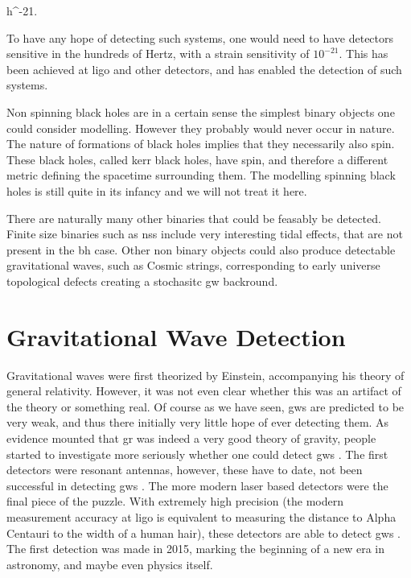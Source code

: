\documentclass[
  10pt,
  a4paper,
  DIV=11,
  numbers=noendperiod,
  twoside]{scrreprt}
\let\[\relax \let\]\relax %
\DeclareRobustCommand{\[}{\begin{equation}}
\DeclareRobustCommand{\]}{\end{equation}}
\begin{document}
\[
h^{-21}.
\]

To have any hope of detecting such systems, one would need to have
detectors sensitive in the hundreds of Hertz, with a strain sensitivity
of \(10^{-21}\). This has been achieved at \gls{ligo} and other
detectors, and has enabled the detection of such systems.

Non spinning black holes are in a certain sense the simplest binary
objects one could consider modelling. However they probably would never
occur in nature. The nature of formations of black holes implies that
they necessarily also spin. These black holes, called kerr black holes,
have spin, and therefore a different metric defining the spacetime
surrounding them. The modelling spinning black holes is still quite in
its infancy and we will not treat it here.

There are naturally many other binaries that could be feasably be
detected. Finite size binaries such as \glspl{ns} include very
interesting tidal effects, that are not present in the \gls{bh} case.
Other non binary objects could also produce detectable gravitational
waves, such as Cosmic strings, corresponding to early universe
topological defects creating a stochasitc \gls{gw} backround.


\hypertarget{gravitational-wave-detection}{%
\chapter{Gravitational Wave
Detection}\label{gravitational-wave-detection}}

Gravitational waves were first theorized by Einstein, accompanying his
theory of general relativity. However, it was not even clear whether
this was an artifact of the theory or something real. Of course as we
have seen, \glspl{gw} are predicted to be very weak, and thus there
initially very little hope of ever detecting them. As evidence mounted
that \gls{gr} was indeed a very good theory of gravity, people started
to investigate more seriously whether one could detect \glspl{gw} . The
first detectors were resonant antennas, however, these have to date, not
been successful in detecting \glspl{gw} . The more modern laser based
detectors were the final piece of the puzzle. With extremely high
precision (the modern measurement accuracy at \gls{ligo} is equivalent
to measuring the distance to Alpha Centauri to the width of a human
hair), these detectors are able to detect \glspl{gw} . The first
detection was made in 2015, marking the beginning of a new era in
astronomy, and maybe even physics itself.
\end{document}
